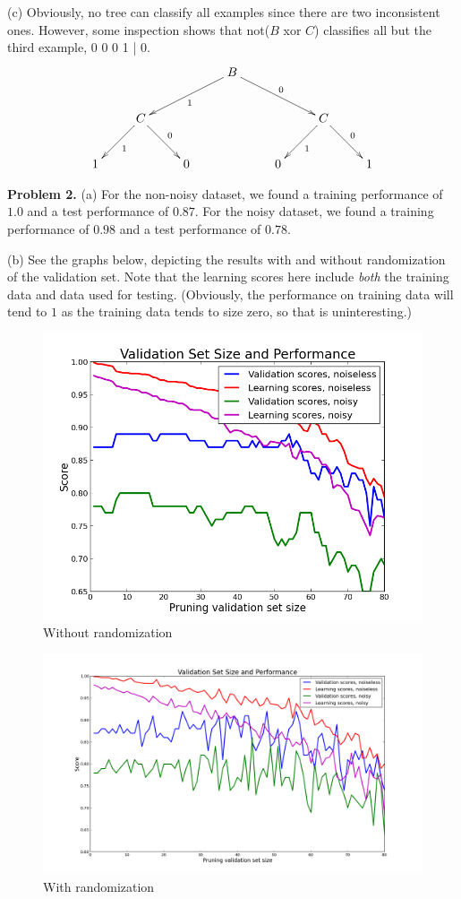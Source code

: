 \documentclass[12pt]{amsart}
\theoremstyle{remark}
\begin{document}
(c) Obviously, no tree can classify all examples since there are two inconsistent ones. However, some inspection shows that not($B$ xor $C$) classifies all but the third example, 0 0 0 1 | 0. 
\[
\xymatrix{
& & & \ar[dll]^1 \ar[drr]^0 B  & & & \\
& C \ar[dl]^1 \ar[dr]^0 & & & & C \ar[dl]^1 \ar[dr]^0 \\
1 & & 0 & & 0 &  & 1
}
\]

\newpage

\noindent \textbf{Problem 2.} (a) For the non-noisy dataset, we found a training performance of $1.0$ and a test performance of $0.87$. For the noisy dataset, we found a training performance of $0.98$ and a test performance of $0.78$. 

(b) See the graphs below, depicting the results with and without randomization of the validation set. Note that the learning scores here include \emph{both} the training data and data used for testing. (Obviously, the performance on training data will tend to $1$ as the training data tends to size zero, so that is uninteresting.) 


\begin{figure}[!h]
\includegraphics[scale=.4]{hw1/pruneperformancenorandom.png}
\caption{Without randomization}
\end{figure}

\begin{figure}[!h]
\includegraphics[scale=.4]{hw1/pruneperformance.png}
\caption{With randomization}
\end{figure}
\end{document}
